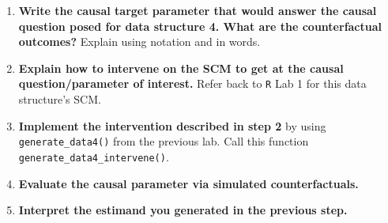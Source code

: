 \documentclass[answers]{exam}
\begin{document}
\begin{enumerate}
\item \textbf{Write the causal target parameter that would answer the causal question posed for data structure 4. What are the counterfactual outcomes?} Explain using notation and in words.
\item \textbf{Explain how to intervene on the SCM to get at the causal question/parameter of interest.} Refer back to \texttt{R} Lab 1 for this data structure's SCM.
\item \textbf{Implement the intervention described in step 2} by using \texttt{generate\_data4()} from the previous lab. Call this function \texttt{generate\_data4\_intervene()}.
\item \textbf{Evaluate the causal parameter via simulated counterfactuals.}
\item \textbf{Interpret the estimand you generated in the previous step.}
\end{enumerate}
\end{document}
